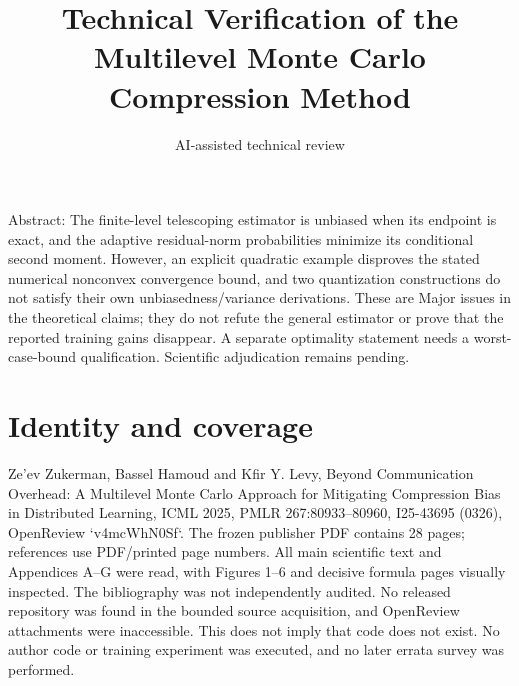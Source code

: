 \documentclass[10pt]{article}
\title{Technical Verification of the Multilevel Monte Carlo Compression Method}
\author{AI-assisted technical review}
\date{}
\begin{document}
\maketitle
Abstract: The finite-level telescoping estimator is unbiased when its endpoint is exact, and the adaptive residual-norm probabilities minimize its conditional second moment. However, an explicit quadratic example disproves the stated numerical nonconvex convergence bound, and two quantization constructions do not satisfy their own unbiasedness/variance derivations. These are Major issues in the theoretical claims; they do not refute the general estimator or prove that the reported training gains disappear. A separate optimality statement needs a worst-case-bound qualification. Scientific adjudication remains pending.\par
\section*{Identity and coverage}
Ze’ev Zukerman, Bassel Hamoud and Kfir Y. Levy, Beyond Communication Overhead: A Multilevel Monte Carlo Approach for Mitigating Compression Bias in Distributed Learning, ICML 2025, PMLR 267:80933–80960, I25-43695 (0326), OpenReview `v4mcWhN0Sf`. The frozen publisher PDF contains 28 pages; references use PDF/printed page numbers. All main scientific text and Appendices A–G were read, with Figures 1–6 and decisive formula pages visually inspected. The bibliography was not independently audited. No released repository was found in the bounded source acquisition, and OpenReview attachments were inaccessible. This does not imply that code does not exist. No author code or training experiment was executed, and no later errata survey was performed.\par
\end{document}
